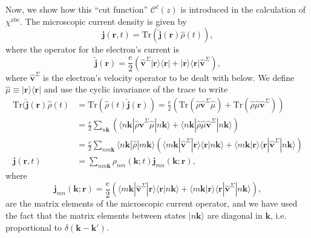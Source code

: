 Now, we show how this ``cut function'' $\mathcal{C}^{\ell}(z)$ is introduced in
the calculation of $\chi^{\mathrm{abc}}$. 
The microscopic current density is given by
\begin{equation}\label{jmic}
\mathbf{j}(\mathbf{r},t)=\mathrm{Tr}(\hat{\mathbf{j}}(\mathbf{r})\hat{\rho}(t)),
\end{equation}
where the operator for the electron's current is
\begin{equation}\label{hatjmic}
\hat{\mathbf{j}}(\mathbf{r})=\frac{e}{2}\left(\hat{\mathbf{v}}^{\Sigma} |\mathbf{r}\rangle\langle\mathbf{r}|
+ |\mathbf{r}\rangle\langle\mathbf{r}|\hat{\mathbf{v}}^{\Sigma}\right), 
\end{equation}
where $\hat{\mathbf{v}}^{\Sigma}$ is the electron's velocity operator to be dealt
with below. We define
$\hat{\mu} \equiv |\mathbf{r}\rangle\langle\mathbf{r}|$ and use the cyclic invariance of
the trace to write
\begin{align}\label{jmic2}
\mathrm{Tr}(\hat{\mathbf{j}}(\mathbf{r})\hat{\rho}(t)
&= \mathrm{Tr}(\hat{\rho}(t)\hat{\mathbf{j}}(\mathbf{r}))
= \frac{e}{2}
\left(
  \mathrm{Tr}(\hat{\rho}\hat{\mathbf{v}}^{\Sigma}\hat{\mu})
+ \mathrm{Tr}(\hat{\rho}\hat{\mu}\hat{\mathbf{v}}^{\Sigma})
\right)\nonumber\\
&= \frac{e}{2}\sum_{n\mathbf{k}}
\left(
\langle n\mathbf{k}| \hat{\rho}\hat{\mathbf{v}}^{\Sigma}\hat{\mu} |n\mathbf{k}\rangle
+ \langle n\mathbf{k}| \hat{\rho}\hat{\mu}\hat{\mathbf{v}}^{\Sigma} |n\mathbf{k}\rangle
\right)\nonumber\\
&= \frac{e}{2}\sum_{nm\mathbf{k}}\langle n\mathbf{k}|\hat{\rho} |m\mathbf{k}\rangle
\left(
\langle m\mathbf{k}| \hat{\mathbf{v}}^{\Sigma}|\mathbf{r}\rangle \langle\mathbf{r}|n\mathbf{k}\rangle
+ \langle m\mathbf{k}|\mathbf{r}\rangle \langle\mathbf{r}| \hat{\mathbf{v}}^{\Sigma} |n\mathbf{k}\rangle
\right)
\nonumber\\
\mathbf{j}(\mathbf{r},t)
&= \sum_{nm\mathbf{k}}\rho_{nm}(\mathbf{k};t)\mathbf{j}_{mn}(\mathbf{k};\mathbf{r}),
\end{align}
where
\begin{equation}\label{jmic3}
\mathbf{j}_{mn}(\mathbf{k};\mathbf{r})=
\frac{e}{2}
\left(
\langle m\mathbf{k}| \hat{\mathbf{v}}^{\Sigma} |\mathbf{r}\rangle \langle\mathbf{r}|n\mathbf{k}\rangle
+
\langle m\mathbf{k}|\mathbf{r}\rangle \langle\mathbf{r}| \hat{\mathbf{v}}^{\Sigma} |n\mathbf{k}\rangle
\right),
\end{equation}
are the matrix elements of the microscopic current operator,
and we have used the fact that the matrix elements between states $|n\mathbf{k}\rangle$
are diagonal in $\mathbf{k}$, i.e. proportional to $\delta(\mathbf{k}-\mathbf{k}')$.

